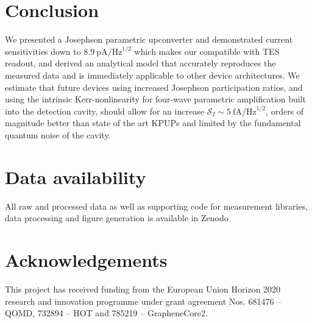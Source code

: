 \section{Conclusion}

We presented a Josephson parametric upconverter and demonstrated current sensitivities down to $\SI{8.9}{\pico\ampere\per\hertz\tothe{1/2}}$ which makes our compatible with TES readout, and derived an analytical model that accurately reproduces the measured data and is immediately applicable to other device architectures.
% 
We estimate that future devices using increased Josephson participation ratios, and using the intrinsic Kerr-nonlinearity for four-wave parametric amplification built into the detection cavity, should allow for an increase $\mathcal{S}_I\sim\SI{5}{\femto\ampere\per\hertz\tothe{1/2}}$, orders of magnitude better than state of the art KPUPs and limited by the fundamental quantum noise of the cavity.


\section*{Data availability}
All raw and processed data as well as supporting code for measurement libraries, data processing and figure generation is available in Zenodo~\cite{zenodo1}

\section*{Acknowledgements}
This project has received funding from the European Union Horizon 2020 research and innovation programme under grant agreement Nos. 681476 -- QOMD, 732894 -- HOT and 785219 -- GrapheneCore2.

